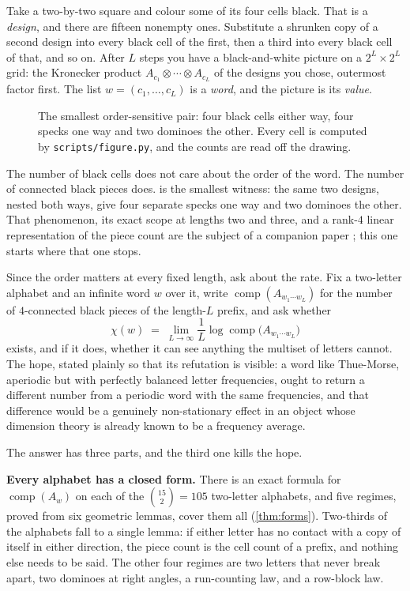 \documentclass[11pt]{amsart}
\theoremstyle{definition}
\theoremstyle{remark}
\newcommand{\fpy}{\texttt{scripts/\allowbreak figure.py}}
\DeclareMathOperator{\comp}{comp}
\begin{document}
Take a two-by-two square and colour some of its four cells black. That is a \emph{design}, and there are fifteen nonempty ones. Substitute a shrunken copy of a second design into every black cell of the first, then a third into every black cell of that, and so on. After $L$ steps you have a black-and-white picture on a $2^L \times 2^L$ grid: the Kronecker product $A_{c_1} \otimes \cdots \otimes A_{c_L}$ of the designs you chose, outermost factor first. The list $w = (c_1, \dots, c_L)$ is a \emph{word}, and the picture is its \emph{value}.
\begin{figure}[!ht]
\centering
\witnessplate
\caption{The smallest order-sensitive pair: four black cells either way, four specks one way and two dominoes the other. Every cell is computed by \fpy{}, and the counts are read off the drawing.}
\label{fig:witness}
\end{figure}

The number of black cells does not care about the order of the word. The number of connected black pieces does.  is the smallest witness: the same two designs, nested both ways, give four separate specks one way and two dominoes the other. That phenomenon, its exact scope at lengths two and three, and a rank-$4$ linear representation of the piece count are the subject of a companion paper \cite{ordersensitivity}; this one starts where that one stops.

Since the order matters at every fixed length, ask about the rate. Fix a two-letter alphabet and an infinite word $w$ over it, write $\comp(A_{w_1 \cdots w_L})$ for the number of $4$-connected black pieces of the length-$L$ prefix, and ask whether
\[
\chi(w) \;=\; \lim_{L \to \infty} \frac{1}{L}\log \comp\bigl(A_{w_1 \cdots w_L}\bigr)
\]
exists, and if it does, whether it can see anything the multiset of letters cannot. The hope, stated plainly so that its refutation is visible: a word like Thue-Morse, aperiodic but with perfectly balanced letter frequencies, ought to return a different number from a periodic word with the same frequencies, and that difference would be a genuinely non-stationary effect in an object whose dimension theory is already known to be a frequency average.

The answer has three parts, and the third one kills the hope.

\medskip
\noindent\textbf{Every alphabet has a closed form.} There is an exact formula for $\comp(A_w)$ on each of the $\binom{15}{2} = 105$ two-letter alphabets, and five regimes, proved from six geometric lemmas, cover them all (\cref{thm:forms}). Two-thirds of the alphabets fall to a single lemma: if either letter has no contact with a copy of itself in either direction, the piece count is the cell count of a prefix, and nothing else needs to be said. The other four regimes are two letters that never break apart, two dominoes at right angles, a run-counting law, and a row-block law.
\end{document}

